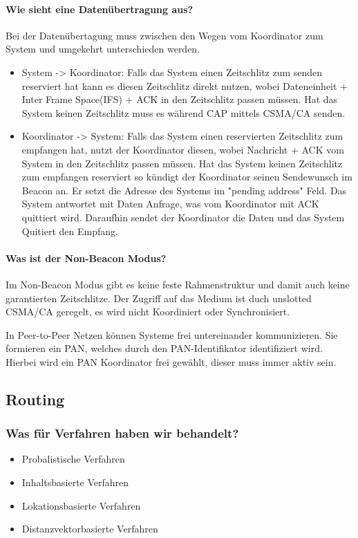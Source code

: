 	\paragraph{Wie sieht eine Datenübertragung aus?}
	Bei der Datenübertagung muss zwischen den Wegen vom Koordinator zum System und umgekehrt unterschieden werden.
	\begin{itemize}
		\item System -> Koordinator: Falls das System einen Zeitschlitz zum senden reserviert hat kann es diesen Zeitschlitz direkt nutzen, wobei Dateneinheit + Inter Frame Space(IFS) + ACK  in den Zeitschlitz passen müssen. Hat das System keinen Zeitschlitz muss es während CAP mittels CSMA/CA senden.
		
		\item Koordinator -> System: Falls das System einen reservierten Zeitschlitz zum empfangen hat, nutzt der Koordinator diesen, wobei Nachricht + ACK vom System in den Zeitschlitz passen müssen. Hat das System keinen Zeitschlitz zum empfangen reserviert so kündigt der Koordinator seinen Sendewunsch im Beacon an. Er setzt die Adresse des Systems im "pending address" Feld. Das System antwortet mit Daten Anfrage, was vom Koordinator mit ACK quittiert wird. Daraufhin sendet der Koordinator die Daten und das System Quitiert den Empfang.
	\end{itemize}
	\begin{figure}[H]
		\centering
	\end{figure}
	
	\paragraph{Was ist der Non-Beacon Modus?}
	Im Non-Beacon Modus gibt es keine feste Rahmenstruktur und damit auch keine garantierten Zeitschlitze. Der Zugriff auf das Medium ist duch unslotted CSMA/CA geregelt, es wird nicht Koordiniert oder Synchronisiert.
	 
	 In Peer-to-Peer Netzen können Systeme frei untereinander kommunizieren. Sie formieren ein PAN, welches durch den PAN-Identifikator identifiziert wird. Hierbei wird ein PAN Koordinator frei gewählt, dieser muss immer aktiv sein.

\subsection{Routing}
\subsubsection{Was für Verfahren haben wir behandelt?}
\begin{itemize}
	\item Probalistische Verfahren
	\item Inhaltsbasierte Verfahren
	\item Lokationsbasierte Verfahren
	\item Distanzvektorbasierte Verfahren
\end{itemize}
